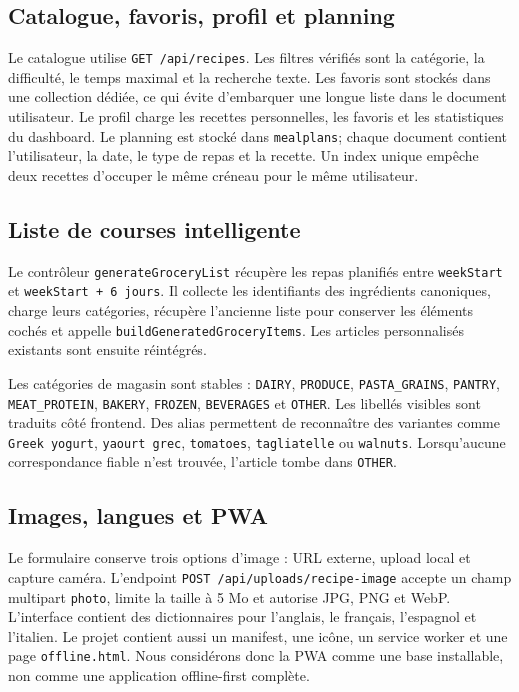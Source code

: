 \documentclass[12pt,a4paper]{report}
\begin{document}
\subsection{Catalogue, favoris, profil et planning}
Le catalogue utilise \texttt{GET /api/recipes}. Les filtres vérifiés sont la catégorie, la difficulté, le temps maximal et la recherche texte. Les favoris sont stockés dans une collection dédiée, ce qui évite d'embarquer une longue liste dans le document utilisateur. Le profil charge les recettes personnelles, les favoris et les statistiques du dashboard. Le planning est stocké dans \texttt{mealplans}; chaque document contient l'utilisateur, la date, le type de repas et la recette. Un index unique empêche deux recettes d'occuper le même créneau pour le même utilisateur.

\subsection{Liste de courses intelligente}
Le contrôleur \texttt{generateGroceryList} récupère les repas planifiés entre \texttt{weekStart} et \texttt{weekStart + 6 jours}. Il collecte les identifiants des ingrédients canoniques, charge leurs catégories, récupère l'ancienne liste pour conserver les éléments cochés et appelle \texttt{buildGeneratedGroceryItems}. Les articles personnalisés existants sont ensuite réintégrés.

Les catégories de magasin sont stables : \texttt{DAIRY}, \texttt{PRODUCE}, \texttt{PASTA\_GRAINS}, \texttt{PANTRY}, \texttt{MEAT\_PROTEIN}, \texttt{BAKERY}, \texttt{FROZEN}, \texttt{BEVERAGES} et \texttt{OTHER}. Les libellés visibles sont traduits côté frontend. Des alias permettent de reconnaître des variantes comme \texttt{Greek yogurt}, \texttt{yaourt grec}, \texttt{tomatoes}, \texttt{tagliatelle} ou \texttt{walnuts}. Lorsqu'aucune correspondance fiable n'est trouvée, l'article tombe dans \texttt{OTHER}.

\subsection{Images, langues et PWA}
Le formulaire conserve trois options d'image : URL externe, upload local et capture caméra. L'endpoint \texttt{POST /api/uploads/recipe-image} accepte un champ multipart \texttt{photo}, limite la taille à 5 Mo et autorise JPG, PNG et WebP. L'interface contient des dictionnaires pour l'anglais, le français, l'espagnol et l'italien. Le projet contient aussi un manifest, une icône, un service worker et une page \texttt{offline.html}. Nous considérons donc la PWA comme une base installable, non comme une application offline-first complète.
\end{document}
